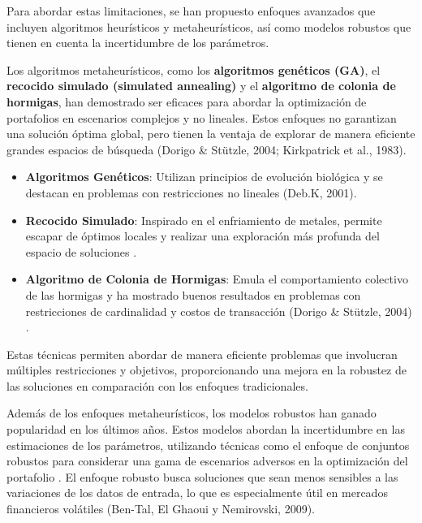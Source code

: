 \documentclass[9pt,a4paper,twoside]{rho-class/rho}
\begin{document}
            \noindent Para abordar estas limitaciones, se han propuesto enfoques avanzados que incluyen algoritmos heurísticos y metaheurísticos, así como modelos robustos que tienen en cuenta la incertidumbre de los parámetros.

            Los algoritmos metaheurísticos, como los \textbf{algoritmos genéticos (GA)}, el \textbf{recocido simulado (simulated annealing)} y el \textbf{algoritmo de colonia de hormigas}, han demostrado ser eficaces para abordar la optimización de portafolios en escenarios complejos y no lineales. Estos enfoques no garantizan una solución óptima global, pero tienen la ventaja de explorar de manera eficiente grandes espacios de búsqueda (Dorigo & Stützle, 2004; Kirkpatrick et al., 1983)\cite{Dorigo2004, Kirkpatrick1983}.
            \begin{itemize}
                \item \textbf{Algoritmos Genéticos}: Utilizan principios de evolución biológica y se destacan en problemas con restricciones no lineales (Deb.K, 2001)\cite{Deb2001}.
                \item \textbf{Recocido Simulado}: Inspirado en el enfriamiento de metales, permite escapar de óptimos locales y realizar una exploración más profunda del espacio de soluciones \cite{Kirkpatrick1983}.
                \item \textbf{Algoritmo de Colonia de Hormigas}: Emula el comportamiento colectivo de las hormigas y ha mostrado buenos resultados en problemas con restricciones de cardinalidad y costos de transacción (Dorigo & Stützle, 2004) \cite{Dorigo2004}.
            \end{itemize}
        
            \noindent Estas técnicas permiten abordar de manera eficiente problemas que involucran múltiples restricciones y objetivos, proporcionando una mejora en la robustez de las soluciones en comparación con los enfoques tradicionales.
        
            \vspace{2mm}\noindent Además de los enfoques metaheurísticos, los modelos robustos han ganado popularidad en los últimos años. Estos modelos abordan la incertidumbre en las estimaciones de los parámetros, utilizando técnicas como el enfoque de conjuntos robustos para considerar una gama de escenarios adversos en la optimización del portafolio .
            El enfoque robusto busca soluciones que sean menos sensibles a las variaciones de los datos de entrada, lo que es especialmente útil en mercados financieros volátiles (Ben-Tal, El Ghaoui y Nemirovski, 2009)\cite{BenTal2009}.
\end{document}
